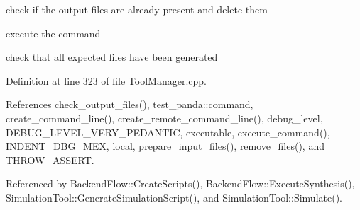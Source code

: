 check if the output files are already present and delete them

execute the command

check that all expected files have been generated 

Definition at line 323 of file Tool\+Manager.\+cpp.



References check\+\_\+output\+\_\+files(), test\+\_\+panda\+::command, create\+\_\+command\+\_\+line(), create\+\_\+remote\+\_\+command\+\_\+line(), debug\+\_\+level, D\+E\+B\+U\+G\+\_\+\+L\+E\+V\+E\+L\+\_\+\+V\+E\+R\+Y\+\_\+\+P\+E\+D\+A\+N\+T\+IC, executable, execute\+\_\+command(), I\+N\+D\+E\+N\+T\+\_\+\+D\+B\+G\+\_\+\+M\+EX, local, prepare\+\_\+input\+\_\+files(), remove\+\_\+files(), and T\+H\+R\+O\+W\+\_\+\+A\+S\+S\+E\+RT.



Referenced by Backend\+Flow\+::\+Create\+Scripts(), Backend\+Flow\+::\+Execute\+Synthesis(), Simulation\+Tool\+::\+Generate\+Simulation\+Script(), and Simulation\+Tool\+::\+Simulate().


